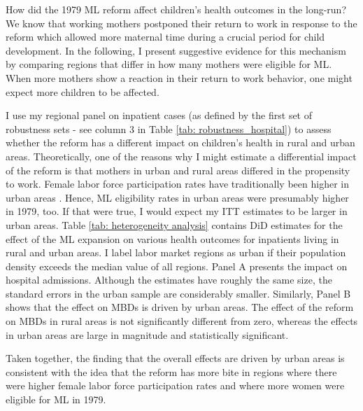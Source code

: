 \documentclass[11pt, a4paper, draft]{article} %
\begin{document}
How did the 1979 ML reform affect children's health outcomes in the long-run? We know that working mothers postponed their return to work in response to the reform \citep{Dustmann2012,schonberg2014expansions} which allowed more maternal time during a crucial period for child development. In the following, I present suggestive evidence for this mechanism by comparing regions that differ in how many mothers were eligible for ML. When more mothers show a reaction in their return to work behavior, one might expect more children to be affected. 

I use my regional panel on inpatient cases (as defined by the first set of robustness sets - see column 3 in Table \ref{tab: robustness_hospital}) to assess whether the reform has a different impact on children's health in rural and urban areas. Theoretically, one of the reasons why I might estimate a differential impact of the reform is that mothers in urban and rural areas differed in the propensity to work. Female labor force participation rates have traditionally been higher in urban areas \citep{bender1993regionale}. Hence, ML eligibility rates in urban areas were presumably higher in 1979, too. If that were true, I would expect my ITT estimates to be larger in urban areas. Table \ref{tab: heterogeneity analysis} contains DiD estimates for the effect of the ML expansion on various health outcomes for inpatients living in rural and urban areas. I label labor market regions as urban if their population density exceeds the median value of all regions. Panel A presents the impact on hospital admissions. Although the estimates have roughly the same size, the standard errors in the urban sample are considerably smaller. Similarly, Panel B shows that the effect on MBDs is driven by urban areas. The effect of the reform on MBDs in rural areas is not significantly different from zero, whereas the effects in urban areas are large in magnitude and statistically significant.

Taken together, the finding that the overall effects are driven by urban areas is consistent with the idea that the reform has more bite in regions where there were higher female labor force participation rates and where more women were eligible for ML in 1979.



\end{document}
